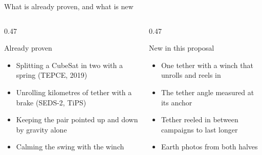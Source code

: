 \documentclass[aspectratio=169,11pt]{beamer}
\begin{document}
\begin{frame}{What is already proven, and what is new}
\begin{columns}[T]
\begin{column}{0.47\textwidth}
\begin{block}{Already proven}
\begin{itemize}
\item Splitting a CubeSat in two with a spring (TEPCE, 2019)
\item Unrolling kilometres of tether with a brake (SEDS-2, TiPS)
\item Keeping the pair pointed up and down by gravity alone
\item Calming the swing with the winch
\end{itemize}
\end{block}
\end{column}
\begin{column}{0.47\textwidth}
\begin{block}{New in this proposal}
\begin{itemize}
\item One tether with a winch that unrolls and reels in
\item The tether angle measured at its anchor
\item Tether reeled in between campaigns to last longer
\item Earth photos from both halves
\end{itemize}
\end{block}
\end{column}
\end{columns}
\end{frame}
\end{document}
